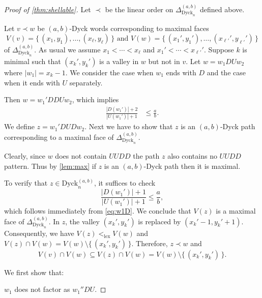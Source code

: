 \documentclass[11pt]{amsart}
\def\Dyck{\mathrm{Dyck}}
\theoremstyle{plain}
\numberwithin{lemma}{\DefaultNumberTheoremWithin}
\numberwithin{theorem}{\DefaultNumberTheoremWithin}
\numberwithin{corollary}{\DefaultNumberTheoremWithin}
\numberwithin{proposition}{\DefaultNumberTheoremWithin}
\numberwithin{conjecture}{\DefaultNumberTheoremWithin}
\theoremstyle{definition}
\numberwithin{definition}{\DefaultNumberTheoremWithin}
\numberwithin{question}{\DefaultNumberTheoremWithin}
\numberwithin{problem}{\DefaultNumberTheoremWithin}
\theoremstyle{remark}
\numberwithin{remark}{\DefaultNumberTheoremWithin}
\numberwithin{example}{\DefaultNumberTheoremWithin}
\numberwithin{claim}{\DefaultNumberTheoremWithin}
\begin{document}
\begin{proof}[Proof of \ref{thm:shellable}]
    Let $\prec$ be the linear order on $\Delta^{(a,b)}_{\Dyck_n}$
    defined above.

    Let $v \prec w$ be $(a,b)$-Dyck words corresponding to maximal faces
    \[V(v) = \big\{\,(x_1,y_1),\dots,(x_\ell,y_\ell)\,\big\} \text{ and } V(w) = \big\{\,(x_1',y_1'),\dots,(x_{\ell'}',y_{\ell'}')\,\big\} \] of $\Delta^{(a,b)}_{\Dyck_n}$. As usual we assume
    $x_1 < \cdots < x_\ell$ and $x_1' < \cdots < x_{\ell'}'$.
    Suppose $k$ is minimal such that $(x_k', y_k')$ is a valley in $w$ but not 
    in $v$. Let $w = w_1DUw_2$ where $|w_1| = x_k-1$. We consider the case when $w_1$ ends with $D$ and
    the case when it ends with $U$ separately. 

\medskip

\medskip

    Then $w = w_1' D D U w_2$, which implies
    \begin{align} \label{eq:w1D}
    \frac{|D(w_1')| + 2}{|U(w_1')| + 1} & \le \frac{a}{b}.
    \end{align}
    We define $z = w_1'DUDw_2$. Next we have to show that $z$ is an $(a,b)$-Dyck path corresponding to a maximal face of $\Delta_{\Dyck_n}^ {(a,b)}$. 
    
    Clearly, since $w$ does not contain $UUDD$ the path $z$ also contains no $UUDD$ pattern.
    Thus by \ref{lem:max} if $z$ is an $(a,b)$-Dyck path then it is maximal.
    
    To verify that $z \in \Dyck^{(a,b)}_n$, it suffices to check
    \[
    \frac{|D(w_1')| + 1}{|U(w_1')| + 1} \le \frac{a}{b},
    \]
    which follows immediately from \eqref{eq:w1D}. We conclude that 
    $V(z)$ is a maximal face of $\Delta_{\Dyck_n}^{(a,b)}$. In $z$, the valley $(x_k',y_k')$ is
    replaced by $(x_k' - 1, y_k' + 1)$. Consequently, we have $V(z) <_{\text{lex}} V(w)$ and
    $V(z) \cap V(w) = V(w) \setminus \{\,(x_k', y_k')\,\}$. Therefore, $z  \prec w$ and
    \[
    V(v) \cap V(w) \subseteq V(z) \cap V(w) = V(w) \setminus \{\,(x_k', y_k')\,\}.
    \]

    \medskip

\medskip

 \noindent We first show that:
 
 \smallskip
 
 
  $w_1$ does not factor as $w_1''DU$. 


\end{proof}
\end{document}

